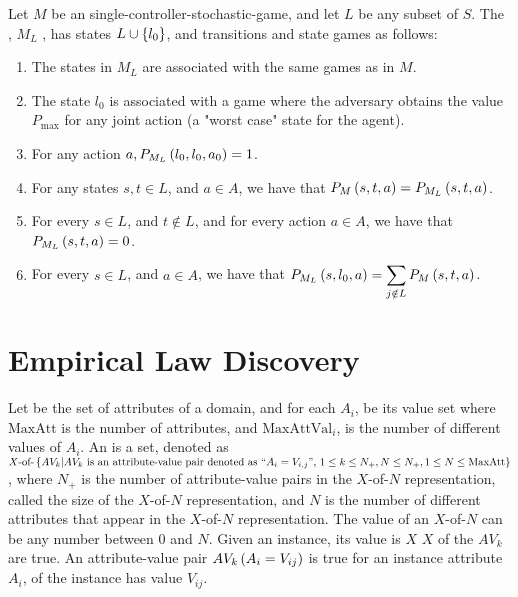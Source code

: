 \begin{defi}
Let $M$ be an single-controller-stochastic-game, and let $L$ be any subset of $S$. The , $M_L$ , has states $L\cup\left\{ l_0\right\}$, and transitions and state games as follows:
\begin{enumerate}
 \item The states in $M_L$ are associated with the same games as in $M$.
 \item The state $l_0$ is associated with a game where the adversary obtains the value $P_{\mbox{max}}$ for any joint action (a "worst case" state for the agent).
 \item For any action $a,P_{M_L}\left(l_0,l_0,a_0\right)=1$.
 \item For any states $s,t\in L$, and $a\in A$, we have that $P_M\left(s,t,a\right)=P_{M_L}\left(s,t,a\right)$.
 \item For every $s\in L$, and $t\notin L$, and for every action $a\in A$, we have that $P_{M_L}\left(s,t,a\right)=0$.
 \item For every $s\in L$, and $a\in A$, we have that $P_{M_L}\left(s,l_0,a\right)=\displaystyle\sum_{j\notin L}{P_M\left(s,t,a\right)}$.
\end{enumerate}
\cite{Brafman:1999:NPA:1624312.1624324}
\end{defi}


\section{Empirical Law Discovery}

\begin{defi}[$X$-of-$N$ representation]
Let  be the set of attributes of a domain, and for each $A_i$,  be its value set where $\mbox{MaxAtt}$ is the number of attributes, and $\mbox{MaxAttVal}_i$, is the number of different values of $A_i$. An  is a set, denoted as $\mbox{$X$-of-}\left\{ AV_k|AV_k\mbox{ is an attribute-value pair denoted as ``}A_i=V_{i,j}\mbox{'', }1\leq k\leq N_+, N\leq N_+, 1\leq N\leq\mbox{MaxAtt}\right\}$, where $N_+$ is the number of attribute-value pairs in the $X$-of-$N$ representation, called the size of the $X$-of-$N$ representation, and $N$ is the number of different attributes that appear in the $X$-of-$N$ representation. The value of an $X$-of-$N$ can be any number between $0$ and $N$. Given an instance, its value is $X$ \iffTx{} $X$ of the $AV_k$ are true. An attribute-value pair $AV_k\left(A_i=V_{ij}\right)$ is true for an instance \iffTx{} attribute $A_i$, of the instance has value $V_{ij}$.
\cite{conf/ijcai/Zheng95}
\end{defi}

